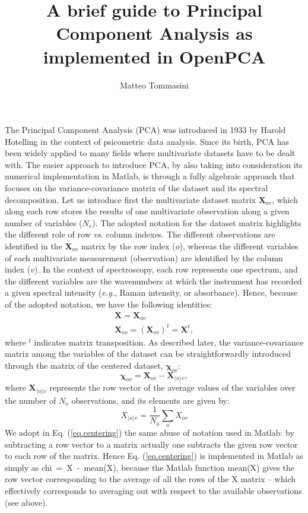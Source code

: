 \documentclass[11pt]{amsart}
\title{A brief guide to Principal Component Analysis as implemented in OpenPCA}
\author{Matteo Tommasini}
\date{}                                           %
\begin{document}
\maketitle

%
The Principal Component Analysis (PCA) was introduced in 1933 by Harold Hotelling \cite{Hotelling1933} in the context of psicometric data analysis. Since its birth, PCA has been widely applied to many fields where multivariate datasets have to be dealt with.
The easier approach to introduce PCA, by also taking into consideration its numerical implementation in Matlab, is through a fully algebraic approach that focuses on the variance-covariance matrix of the dataset and its spectral decomposition.
%
Let us introduce first the multivariate dataset matrix $\bm X_{ov}$, which along each row stores the results of one multivariate observation along a given number of variables ($N_v$). The adopted notation for the dataset matrix highlights the different role of row {\it vs.} column indexes. The different observations are identified in the $\bm X_{ov}$ matrix by the row index ($o$), whereas the different variables of each multivariate measurement (observation) are identified by the column index ($v$). In the context of spectroscopy, each row represents one spectrum, and the different variables are the wavenumbers at which the instrument has recorded a given spectral intensity ({\it e.g.}, Raman intensity, or absorbance). Hence, because of the adopted notation, we have the following identities:
%
\begin{eqnarray}
\bm X = \bm X_{ov}
\\ \nonumber
\bm X_{vo} = \left( \bm X_{ov} \right)^t = \bm X^t,
\end{eqnarray}
%
where $^t$ indicates matrix transposition. As described later, the variance-covariance matrix among the variables of the dataset can be straightforwardly introduced through the matrix of the centered dataset, $\bm \chi_{ov}$:
%
\begin{equation}
\label{eq.centering}
\bm \chi_{ov} = \bm X_{ov} -  \bm X_{\langle o \rangle v},
\end{equation}
%
where $\bm X_{\langle o \rangle v}$ represents the row vector of the average values of the variables over the number of $N_o$ observations, and its elements are given by:
%
\begin{equation}
\label{eq.average}
X_{\langle o \rangle v} = \frac{1}{N_o} \sum_{o} X_{ov} 
\end{equation}
%
We adopt in Eq. (\ref{eq.centering}) the same abuse of notation used in Matlab: by subtracting a row vector to a matrix actually one subtracts the given row vector to each row of the matrix. Hence Eq. (\ref{eq.centering}) is implemented in Matlab as simply as \mbox{chi = X - mean(X)}, because the Matlab function mean(X) gives the row vector corresponding to the average of all the rows of the X matrix -- which effectively corresponds to averaging out with respect to the available observations (see above).
\end{document}
